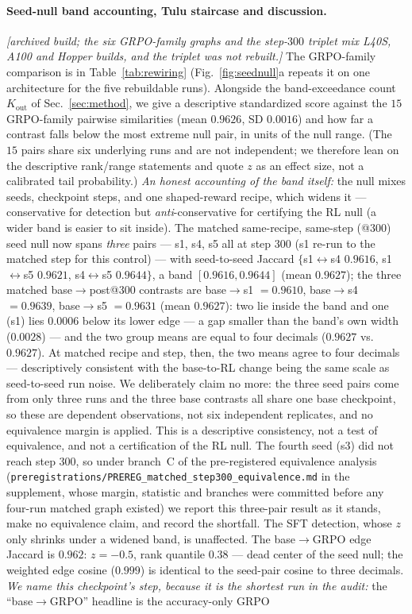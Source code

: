 \documentclass{article}
\begin{document}
\paragraph{Seed-null band accounting, Tulu staircase and discussion.}
\emph{[archived build; the six GRPO-family graphs and the step-$300$ triplet mix L40S, A100 and Hopper builds, and the triplet was not rebuilt.]} The GRPO-family comparison is in Table~\ref{tab:rewiring} (Fig.~\ref{fig:seednull}a repeats it on one architecture for the five rebuildable runs). Alongside the band-exceedance count $K_{\mathrm{out}}$ of Sec.~\ref{sec:method}, we give a descriptive standardized score against the $15$ GRPO-family pairwise similarities (mean $0.9626$, SD $0.0016$) and how far a contrast falls below the most extreme null pair, in units of the null range. (The $15$ pairs share six underlying runs and are not independent; we therefore lean on the descriptive rank/range statements and quote $z$ as an effect size, not a calibrated tail probability.) \emph{An honest accounting of the band itself:} the null mixes seeds, checkpoint steps, and one shaped-reward recipe, which widens it --- conservative for detection but \emph{anti}-conservative for certifying the RL null (a wider band is easier to sit inside). The matched same-recipe, same-step (@$300$) seed null now spans \emph{three} pairs --- s1, s4, s5 all at step $300$ (s1 re-run to the matched step for this control) --- with seed-to-seed Jaccard $\{$s1$\leftrightarrow$s4 $0.9616$, s1$\leftrightarrow$s5 $0.9621$, s4$\leftrightarrow$s5 $0.9644\}$, a band $[0.9616, 0.9644]$ (mean $0.9627$); the three matched base$\to$post@$300$ contrasts are base$\to$s1 $=0.9610$, base$\to$s4 $=0.9639$, base$\to$s5 $=0.9631$ (mean $0.9627$): two lie inside the band and one (s1) lies $0.0006$ below its lower edge --- a gap smaller than the band's own width ($0.0028$) --- and the two group means are equal to four decimals ($0.9627$ vs.\ $0.9627$). At matched recipe and step, then, the two means agree to four decimals --- descriptively consistent with the base-to-RL change being the same scale as seed-to-seed run noise. We deliberately claim no more: the three seed pairs come from only three runs and the three base contrasts all share one base checkpoint, so these are dependent observations, not six independent replicates, and no equivalence margin is applied. This is a descriptive consistency, not a test of equivalence, and not a certification of the RL null. The fourth seed (s3) did not reach step $300$, so under branch~C of the pre-registered equivalence analysis (\texttt{preregistrations/PREREG\_matched\_step300\_equivalence.md} in the supplement, whose margin, statistic and branches were committed before any four-run matched graph existed) we report this three-pair result as it stands, make no equivalence claim, and record the shortfall. The SFT detection, whose $z$ only shrinks under a widened band, is unaffected. The base$\to$GRPO edge Jaccard is $0.962$: $z=-0.5$, rank quantile $0.38$ --- dead center of the seed null; the weighted edge cosine ($0.999$) is identical to the seed-pair cosine to three decimals. \emph{We name this checkpoint's step, because it is the shortest run in the audit:} the ``base$\to$GRPO'' headline is the accuracy-only GRPO 
\end{document}
